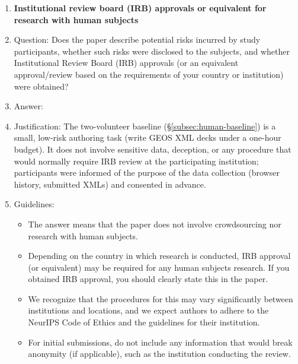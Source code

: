 \begin{enumerate}
\item {\bf Institutional review board (IRB) approvals or equivalent for research with human subjects}
    \item[] Question: Does the paper describe potential risks incurred by study participants, whether such risks were disclosed to the subjects, and whether Institutional Review Board (IRB) approvals (or an equivalent approval/review based on the requirements of your country or institution) were obtained?
    \item[] Answer: \answerNA{}
    \item[] Justification: The two-volunteer baseline (\S\ref{subsec:human-baseline}) is a small, low-risk authoring task (write GEOS XML decks under a one-hour budget). It does not involve sensitive data, deception, or any procedure that would normally require IRB review at the participating institution; participants were informed of the purpose of the data collection (browser history, submitted XMLs) and consented in advance.
    \item[] Guidelines:
    \begin{itemize}
        \item The answer \answerNA{} means that the paper does not involve crowdsourcing nor research with human subjects.
        \item Depending on the country in which research is conducted, IRB approval (or equivalent) may be required for any human subjects research. If you obtained IRB approval, you should clearly state this in the paper.
        \item We recognize that the procedures for this may vary significantly between institutions and locations, and we expect authors to adhere to the NeurIPS Code of Ethics and the guidelines for their institution.
        \item For initial submissions, do not include any information that would break anonymity (if applicable), such as the institution conducting the review.
    \end{itemize}


\end{enumerate}
